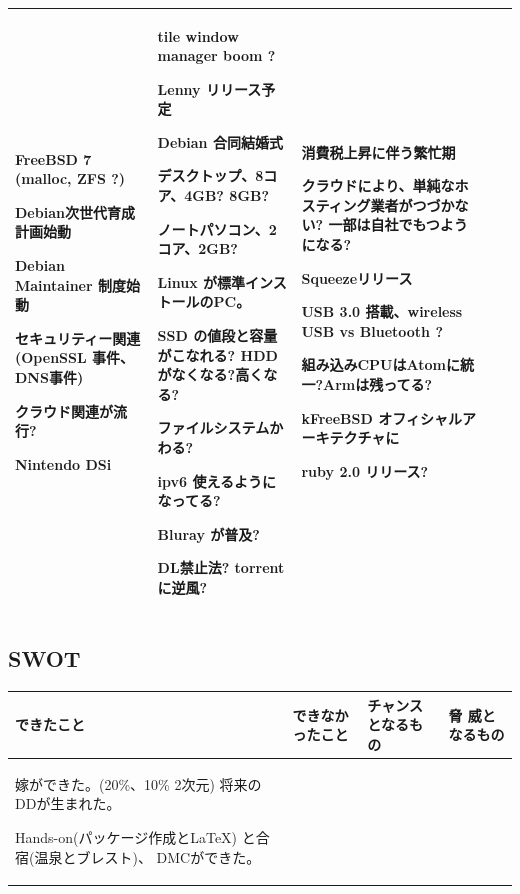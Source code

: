 \documentclass[mingoth,a4paper]{jsarticle}
\begin{document}
\begin{commandline}
{\begin{tabular}[t]{|p{8em}|p{8em}|p{12em}|p{8em}|p{8em}|}
FreeBSD 7 (malloc, ZFS ?)

Debian次世代育成計画始動

Debian Maintainer 制度始動

セキュリティー関連(OpenSSL 事件、DNS事件)

クラウド関連が流行?

Nintendo DSi

&

tile window manager boom ?

Lenny リリース予定

Debian 合同結婚式

デスクトップ、8コア、4GB? 8GB?

ノートパソコン、2コア、2GB?

Linux が標準インストールのPC。

SSD の値段と容量がこなれる?
HDDがなくなる?高くなる?

ファイルシステムかわる?

ipv6 使えるようになってる?

Bluray が普及?

DL禁止法? torrent に逆風?

&

消費税上昇に伴う繁忙期

クラウドにより、単純なホスティング業者がつづかない?
一部は自社でもつようになる?

Squeezeリリース

USB 3.0 搭載、wireless USB vs Bluetooth ?

組み込みCPUはAtomに統一?Armは残ってる?

kFreeBSD オフィシャルアーキテクチャに

ruby 2.0 リリース?

 \\

\hline
\end{tabular}

}

\subsection{SWOT}

{\large
\begin{tabular}[t]{|p{8em}|p{8em}|p{8em}|p{8em}|}
\hline
できたこと & できなかったこと & チャンスとなるもの & 脅
 威となるもの \\
\hline
嫁ができた。(20\%、10\% 2次元)
将来のDDが生まれた。

Hands-on(パッケージ作成と\LaTeX{}) と合宿(温泉とブレスト)、
DMCができた。


\end{tabular}}
\end{commandline}
\end{document}
